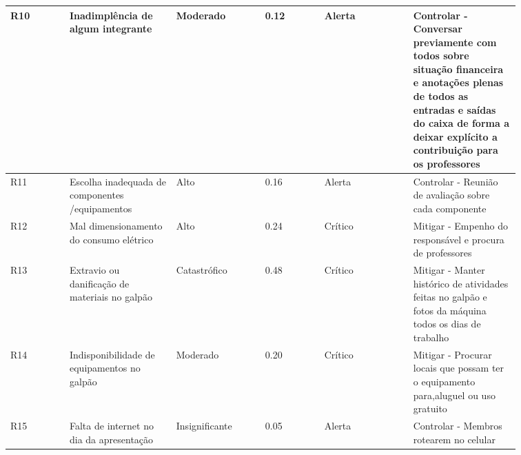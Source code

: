 \begin{apendicesenv}
\begin{table}[!htp]
\begin{tabular}{|p{0.10\linewidth}|p{0.18\linewidth}|p{0.15\linewidth}|p{0.10\linewidth}|p{0.15\linewidth}|p{0.18\linewidth}|}
    R10 & Inadimplência de algum integrante & Moderado & 0.12 & Alerta & Controlar - Conversar previamente com todos sobre situação financeira e anotações plenas de todos as entradas e saídas do caixa de forma a deixar explícito a contribuição para os professores \\ \hline
    R11 & Escolha inadequada de componentes /equipamentos & Alto & 0.16 & Alerta & Controlar - Reunião de avaliação sobre cada componente \\ \hline
    R12 & Mal dimensionamento do consumo elétrico & Alto & 0.24 & Crítico & Mitigar - Empenho do responsável e procura de professores \\ \hline
    R13 & Extravio ou danificação de materiais no galpão & Catastrófico & 0.48 & Crítico & Mitigar - Manter histórico de atividades feitas no galpão e fotos da máquina todos os dias de trabalho \\ \hline
    R14 & Indisponibilidade de equipamentos no galpão & Moderado & 0.20 & Crítico & Mitigar - Procurar locais que possam ter o equipamento para,aluguel ou uso gratuito \\ \hline
    R15 & Falta de internet no dia da apresentação & Insignificante & 0.05 & Alerta & Controlar - Membros rotearem no celular \\ \hline
    \end{tabular}
\end{table}

\newpage

\end{apendicesenv}
